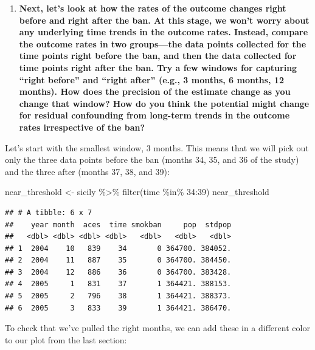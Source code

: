 \documentclass[
]{book}
\newenvironment{Shaded}{\begin{snugshade}}{\end{snugshade}}
\newcommand{\DecValTok}[1]{\textcolor[rgb]{0.00,0.00,0.81}{#1}}
\newcommand{\FunctionTok}[1]{\textcolor[rgb]{0.00,0.00,0.00}{#1}}
\newcommand{\NormalTok}[1]{#1}
\newcommand{\OtherTok}[1]{\textcolor[rgb]{0.56,0.35,0.01}{#1}}
\newcommand{\SpecialCharTok}[1]{\textcolor[rgb]{0.00,0.00,0.00}{#1}}
\providecommand{\tightlist}{%
  \setlength{\itemsep}{0pt}\setlength{\parskip}{0pt}}
\begin{document}
\begin{enumerate}
\def\labelenumi{\arabic{enumi}.}
\setcounter{enumi}{1}
\tightlist
\item
  \textbf{Next, let's look at how the rates of the outcome changes right before and right after the ban. At this stage, we won't worry about any underlying time trends in the outcome rates. Instead, compare the outcome rates in two groups---the data points collected for the time points right before the ban, and then the data collected for time points right after the ban. Try a few windows for capturing ``right before'' and ``right after'' (e.g., 3 months, 6 months, 12 months). How does the precision of the estimate change as you change that window? How do you think the potential might change for residual confounding from long-term trends in the outcome rates irrespective of the ban?}
\end{enumerate}

Let's start with the smallest window, 3 months. This means that we will pick out
only the three data points before the ban (months 34, 35, and 36 of the study) and the three after (months 37, 38, and 39):

\begin{Shaded}
\begin{Highlighting}[]
\NormalTok{near\_threshold }\OtherTok{\textless{}{-}}\NormalTok{ sicily }\SpecialCharTok{\%\textgreater{}\%} 
  \FunctionTok{filter}\NormalTok{(time }\SpecialCharTok{\%in\%} \DecValTok{34}\SpecialCharTok{:}\DecValTok{39}\NormalTok{)}
\NormalTok{near\_threshold}
\end{Highlighting}
\end{Shaded}

\begin{verbatim}
## # A tibble: 6 x 7
##    year month  aces  time smokban     pop  stdpop
##   <dbl> <dbl> <dbl> <dbl>   <dbl>   <dbl>   <dbl>
## 1  2004    10   839    34       0 364700. 384052.
## 2  2004    11   887    35       0 364700. 384450.
## 3  2004    12   886    36       0 364700. 383428.
## 4  2005     1   831    37       1 364421. 388153.
## 5  2005     2   796    38       1 364421. 388373.
## 6  2005     3   833    39       1 364421. 386470.
\end{verbatim}

To check that we've pulled the right months, we can add these in a different color to our plot from the last section:
\end{document}

